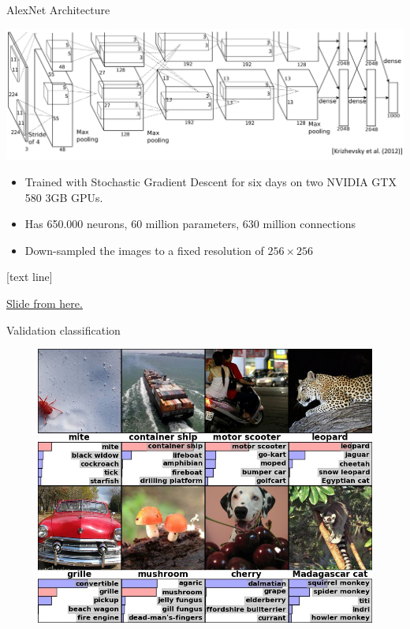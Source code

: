 \documentclass{beamer}
\newcommand{\referencefootnote}[1]{\setbeamertemplate{footline}[text line]{%
\parbox{0.9\paperwidth}{\vspace*{-23pt}\tiny{\textcolor{gray}{#1}}\hfill\scriptsize\insertframenumber}}}
\begin{document}
	
	\begin{frame}{AlexNet Architecture}%
	\begin{center}
	\includegraphics[scale=0.13]{figures/alexnet_paper.jpg} 
	\end{center}
	\footnotesize
	\begin{itemize}
	\item Trained with Stochastic Gradient Descent for six days on two NVIDIA GTX 580 3GB GPUs.
	\item Has 650.000 neurons, 60 million parameters, 630 million connections
	\item Down-sampled the images to a fixed resolution of $256 \times256$
	\end{itemize} 
	\end{frame}
	
		{ \referencefootnote{\href{http://image-net.org/challenges/LSVRC/2012/supervision.pdf}{Slide from \underline{here}.}}
	\begin{frame}{Validation classification}%
				\begin{figure}
            \centering
            \includegraphics[width=0.7\linewidth]{figures/alexnet_validation.jpg}
        \end{figure}
	\end{frame}
	}
	
\end{document}
